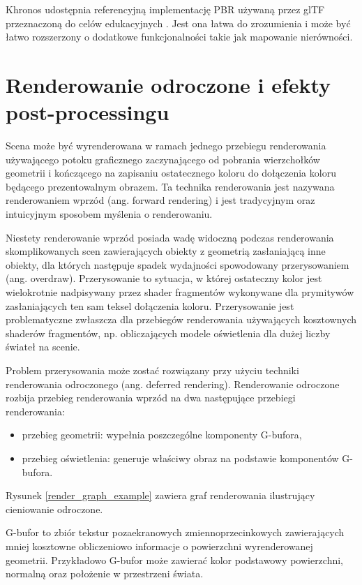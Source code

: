 Khronos udostępnia referencyjną implementację PBR używaną przez glTF przeznaczoną do celów edukacyjnych \cite{GLTFSAMPLEVIEWER}. Jest ona łatwa do zrozumienia i może być łatwo rozszerzony o dodatkowe funkcjonalności takie jak mapowanie nierówności.



\section{Renderowanie odroczone i efekty post-processingu}

Scena może być wyrenderowana w ramach jednego przebiegu renderowania używającego potoku graficznego zaczynającego od pobrania wierzchołków geometrii i kończącego na zapisaniu ostatecznego koloru do dołączenia koloru będącego prezentowalnym obrazem.
Ta technika renderowania jest nazywana renderowaniem wprzód (ang. forward rendering) i jest tradycyjnym oraz intuicyjnym sposobem myślenia o renderowaniu.

Niestety renderowanie wprzód posiada wadę widoczną podczas renderowania skomplikowanych scen zawierających obiekty z geometrią zasłaniającą inne obiekty, dla których następuje spadek wydajności spowodowany przerysowaniem (ang. overdraw).
Przerysowanie to sytuacja, w której ostateczny kolor jest wielokrotnie nadpisywany przez shader fragmentów wykonywane dla prymitywów zasłaniających ten sam teksel dołączenia koloru.
Przerysowanie jest problematyczne zwłaszcza dla przebiegów renderowania używających kosztownych shaderów fragmentów, np. obliczających modele oświetlenia dla dużej liczby świateł na scenie.

Problem przerysowania może zostać rozwiązany przy użyciu techniki renderowania odroczonego (ang. deferred rendering).
Renderowanie odroczone rozbija przebieg renderowania wprzód na dwa następujące przebiegi renderowania:
\begin{itemize}
	\item przebieg geometrii: wypełnia poszczególne komponenty G-bufora,
	\item przebieg oświetlenia: generuje właściwy obraz na podstawie komponentów G-bufora.
\end{itemize}
Rysunek \ref{render_graph_example} zawiera graf renderowania ilustrujący cieniowanie odroczone.

G-bufor to zbiór tekstur pozaekranowych zmiennoprzecinkowych zawierających mniej kosztowne obliczeniowo informacje o powierzchni wyrenderowanej geometrii.
Przykładowo G-bufor może zawierać kolor podstawowy powierzchni, normalną oraz położenie w przestrzeni świata.

